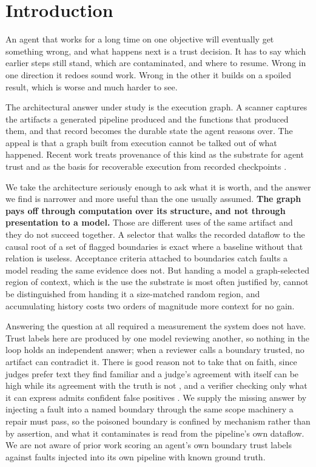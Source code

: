\section{Introduction}

An agent that works for a long time on one objective will eventually get something wrong,
and what happens next is a trust decision. It has to say which earlier steps still stand,
which are contaminated, and where to resume. Wrong in one direction it redoes sound work.
Wrong in the other it builds on a spoiled result, which is worse and much harder to see.

The architectural answer under study is the execution graph. A scanner captures the
artifacts a generated pipeline produced and the functions that produced them, and that
record becomes the durable state the agent reasons over. The appeal is that a graph built
from execution cannot be talked out of what happened. Recent work treats provenance of this
kind as the substrate for agent trust \cite{wang2026traces} and as the basis for
recoverable execution from recorded checkpoints \cite{zhuang2026agentrewind}.

We take the architecture seriously enough to ask what it is worth, and the answer we find
is narrower and more useful than the one usually assumed. \textbf{The graph pays off
through computation over its structure, and not through presentation to a model.} Those are
different uses of the same artifact and they do not succeed together. A selector that walks
the recorded dataflow to the causal root of a set of flagged boundaries is exact where a
baseline without that relation is useless. Acceptance criteria attached to boundaries catch
faults a model reading the same evidence does not. But handing a model a graph-selected
region of context, which is the use the substrate is most often justified by, cannot be
distinguished from handing it a size-matched random region, and accumulating history costs
two orders of magnitude more context for no gain.

Answering the question at all required a measurement the system does not have. Trust labels
here are produced by one model reviewing another, so nothing in the loop holds an
independent answer; when a reviewer calls a boundary trusted, no artifact can contradict it.
There is good reason not to take that on faith, since judges prefer text they find familiar
\cite{wataoka2024selfpreference} and a judge's agreement with itself can be high while its
agreement with the truth is not \cite{norman2026reliability}, and a verifier checking only
what it can express admits confident false positives \cite{helff2026gaming}. We supply the missing answer
by injecting a fault into a named boundary through the same scope machinery a repair must
pass, so the poisoned boundary is confined by mechanism rather than by assertion, and what
it contaminates is read from the pipeline's own dataflow. We are not aware of prior work
scoring an agent's own boundary trust labels against faults injected into its own pipeline
with known ground truth.

